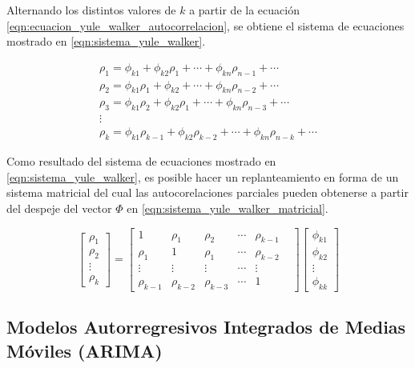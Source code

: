 \documentclass[
]{article}
\begin{document}
Alternando los distintos valores de \(k\) a partir de la ecuación
\eqref{eqn:ecuacion_yule_walker_autocorrelacion}, se obtiene el sistema
de ecuaciones mostrado en \eqref{eqn:sistema_yule_walker}.

\begin{equation}
\label{eqn:sistema_yule_walker}
\begin{array}{lll} 
\rho_1=\phi_{k1} + \phi_{k2}\rho_{1} + \cdots + \phi_{kn}\rho_{n-1}+\cdots \\
\rho_2=\phi_{k1}\rho_{1} + \phi_{k2} + \cdots + \phi_{kn}\rho_{n-2}+\cdots \\
\rho_3=\phi_{k1}\rho_{2} + \phi_{k2}\rho_{1} + \cdots + \phi_{kn}\rho_{n-3}+\cdots \\
\vdots \\
\rho_k=\phi_{k1}\rho_{k-1} + \phi_{k2}\rho_{k-2} + \cdots + \phi_{kn}\rho_{n-k}+\cdots
\end{array}
\end{equation}

Como resultado del sistema de ecuaciones mostrado en
\eqref{eqn:sistema_yule_walker}, es posible hacer un replanteamiento en
forma de un sistema matricial del cual las autocorelaciones parciales
pueden obtenerse a partir del despeje del vector \(\Phi\) en
\eqref{eqn:sistema_yule_walker_matricial}.

\begin{equation}
\label{eqn:sistema_yule_walker_matricial}
\left[ \begin{array}{c} \rho_1 \\ \rho_2 \\ \vdots \\ \rho_k \end{array} \right] = \begin{bmatrix} 1 & \rho_1 & \rho_2 & \cdots & \rho_{k-1} \\ \rho_1 & 1 & \rho_1 & \cdots & \rho_{k-2} \\ \vdots & \vdots & \vdots & \cdots & \vdots \\ \rho_{k-1} & \rho_{k-2} & \rho_{k-3} & \cdots & 1 &\end{bmatrix} \left[ \begin{array}{c} \phi_{k1} \\ \phi_{k2}  \\ \vdots \\ \phi_{kk} \end{array} \right]\end{equation}

\subsection{Modelos Autorregresivos Integrados de Medias Móviles (ARIMA)}
\end{document}
